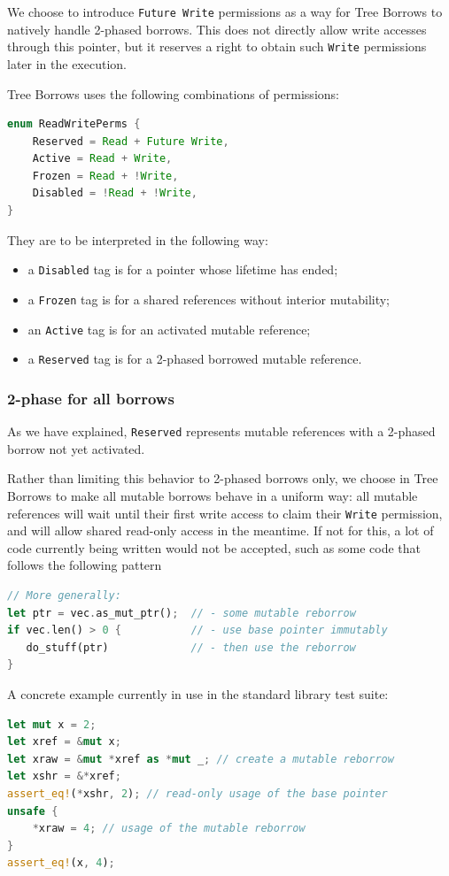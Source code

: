 \documentclass[a4paper,11pt]{article}
\theoremstyle{plain}
\theoremstyle{definition}
\theoremstyle{remark}
\newcommand{\tperm}[1]{\texttt{#1}}
\begin{document}
We choose to introduce \tperm{Future Write} permissions as a way for Tree Borrows to
natively handle 2-phased borrows.
This does not directly allow write accesses through this pointer, but it reserves
a right to obtain such \tperm{Write} permissions later in the execution.

Tree Borrows uses the following combinations of permissions:
\begin{lstlisting}[language=rust]
enum ReadWritePerms {
    Reserved = Read + Future Write,
    Active = Read + Write,
    Frozen = Read + !Write,
    Disabled = !Read + !Write,
}
\end{lstlisting}

They are to be interpreted in the following way:
\begin{itemize}
    \item a \tperm{Disabled} tag is for a pointer whose lifetime has ended;
    \item a \tperm{Frozen} tag is for a shared references without interior mutability;
    \item an \tperm{Active} tag is for an activated mutable reference;
    \item a \tperm{Reserved} tag is for a 2-phased borrowed mutable reference.
\end{itemize}

\subsubsection{2-phase for all borrows}

As we have explained, \tperm{Reserved} represents mutable references with
a 2-phased borrow not yet activated.

Rather than limiting this behavior to 2-phased borrows only, we choose in Tree
Borrows to make all mutable borrows behave in a uniform way: all mutable references
will wait until their first write access to claim their \tperm{Write} permission,
and will allow shared read-only access in the meantime. If not for this, a lot
of code currently being written would not be accepted, such as some code that
follows the following pattern
\begin{lstlisting}[language=rust]
                             // More generally:
let ptr = vec.as_mut_ptr();  // - some mutable reborrow
if vec.len() > 0 {           // - use base pointer immutably
   do_stuff(ptr)             // - then use the reborrow
}
\end{lstlisting}

A concrete example currently in use in the standard library test suite:
\begin{lstlisting}[language=rust]
let mut x = 2;
let xref = &mut x;
let xraw = &mut *xref as *mut _; // create a mutable reborrow
let xshr = &*xref;
assert_eq!(*xshr, 2); // read-only usage of the base pointer
unsafe {
    *xraw = 4; // usage of the mutable reborrow
}
assert_eq!(x, 4);
\end{lstlisting}
\end{document}
